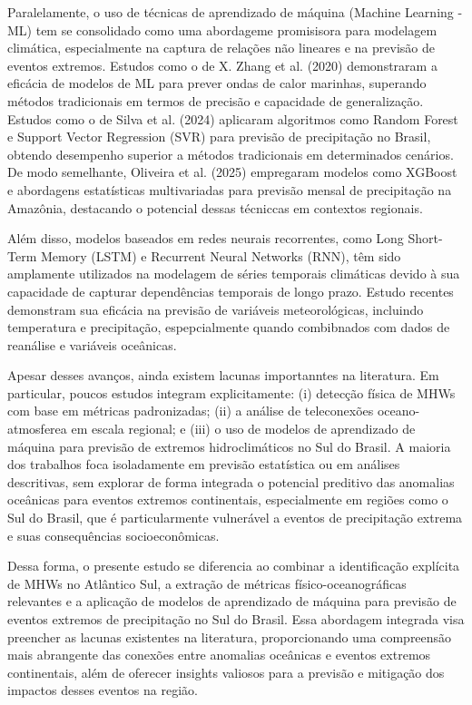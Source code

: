 Paralelamente, o uso de técnicas de aprendizado de máquina (Machine Learning - ML) tem se consolidado como uma abordageme promisisora para modelagem climática, especialmente na captura de relações não lineares e na previsão de eventos extremos. Estudos como o de X. Zhang et al. (2020) demonstraram a eficácia de modelos de ML para prever ondas de calor marinhas, superando métodos tradicionais em termos de precisão e capacidade de generalização.
Estudos como o de Silva et al. (2024) aplicaram algoritmos como Random Forest e Support Vector Regression (SVR) para previsão de precipitação no Brasil, obtendo desempenho superior a métodos tradicionais em determinados cenários.
De modo semelhante, Oliveira et al. (2025) empregaram modelos como XGBoost e abordagens estatísticas multivariadas para previsão mensal de precipitação na Amazônia, destacando o potencial dessas técniccas em contextos regionais.

Além disso, modelos baseados em redes neurais recorrentes, como Long Short-Term Memory (LSTM) e Recurrent Neural Networks (RNN), têm sido amplamente utilizados na modelagem de séries temporais climáticas devido à sua capacidade de capturar dependências temporais de longo prazo. Estudo recentes demonstram sua eficácia na previsão de variáveis meteorológicas, incluindo temperatura e precipitação, espepcialmente quando combibnados com dados de reanálise e variáveis oceânicas.

Apesar desses avanços, ainda existem lacunas importanntes na literatura. Em particular, poucos estudos integram explicitamente: (i) detecção física de MHWs com base em métricas padronizadas; (ii) a análise de teleconexões oceano-atmosferea em escala regional; e (iii) o uso de modelos de aprendizado de máquina para previsão de extremos hidroclimáticos no Sul do Brasil. A maioria dos trabalhos foca isoladamente em previsão estatística ou em análises descritivas, sem explorar de 
forma integrada o potencial preditivo das anomalias oceânicas para eventos extremos continentais, especialmente em regiões como o Sul do Brasil, que é particularmente vulnerável a eventos de precipitação extrema e suas consequências socioeconômicas.

Dessa forma, o presente estudo se diferencia ao combinar a identificação explícita de MHWs no Atlântico Sul, a extração de métricas físico-oceanográficas relevantes e a aplicação de modelos de aprendizado de máquina para previsão de eventos extremos de precipitação no Sul do Brasil. Essa abordagem integrada visa preencher as lacunas existentes na literatura, proporcionando uma compreensão mais abrangente das conexões entre anomalias oceânicas e eventos extremos continentais, 
além de oferecer insights valiosos para a previsão e mitigação dos impactos desses eventos na região.


